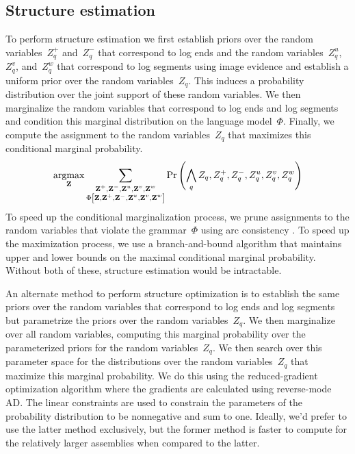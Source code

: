 \subsection{Structure estimation}
\label{sec:structure}
%
To perform structure estimation we first establish priors over the random
variables~$Z^+_q$ and~$Z^-_q$ that correspond to log ends and the random
variables~$Z^u_q$, $Z^v_q$, and~$Z^w_q$ that correspond to log segments using
image evidence and establish a uniform prior over the random variables~$Z_q$.
%
This induces a probability distribution over the joint support of these random
variables.
%
We then marginalize the random variables that correspond to log ends and log
segments and condition this marginal distribution on the language model~$\Phi$.
%
Finally, we compute the assignment to the random variables~$Z_q$ that maximizes
this conditional marginal probability.
%
\begin{displaymath}
\operatorname*{argmax}_{\mathbf{Z}}
\sum_{\substack{\mathbf{Z}^+,\mathbf{Z}^-,\mathbf{Z}^u,\mathbf{Z}^v,\mathbf{Z}^w\\
    \Phi\left[\mathbf{Z},\mathbf{Z}^+,\mathbf{Z}^-,\mathbf{Z}^u,\mathbf{Z}^v,\mathbf{Z}^w\right]}}
\Pr\left(\bigwedge_q Z_q,Z^+_q,Z^-_q,Z^u_q,Z^v_q,Z^w_q\right)
\end{displaymath}
%
To speed up the conditional marginalization process, we prune assignments to
the random variables that violate the grammar~$\Phi$ using arc consistency
\cite{Mackworth1977}.
%
To speed up the maximization process, we use a branch-and-bound algorithm
\cite{Land1960} that maintains upper and lower bounds on the maximal
conditional marginal probability.
%
Without both of these, structure estimation would be intractable.

An alternate method to perform structure optimization is to establish the same
priors over the random variables that correspond to log ends and log segments
but parametrize the priors over the random variables~$Z_q$.
%
We then marginalize over all random variables, computing this marginal
probability over the parameterized priors for the random variables~$Z_q$.
%
We then search over this parameter space for the distributions over the random
variables~$Z_q$ that maximize this marginal probability.
%
We do this using the reduced-gradient optimization algorithm
\cite{Wolfe1962,Wolfe1967} where the gradients are calculated using
reverse-mode AD.\@
%
The linear constraints are used to constrain the parameters of the probability
distribution to be nonnegative and sum to one.
%
Ideally, we'd prefer to use the latter method exclusively, but the former
method is faster to compute for the relatively larger assemblies when compared
to the latter.

